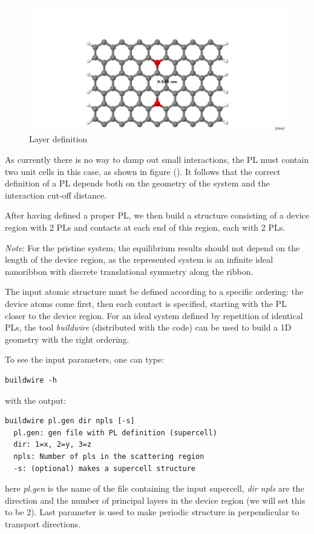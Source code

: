 \documentclass[a4paper,11pt,english]{sphinxmanual}
\begin{document}
{{\begin{figure}[htbp]
\includegraphics[width=0.800\linewidth]{4cell_7.png}
\caption{Layer definition}\label{transport:fig-4cell-7}\end{figure}

As currently there is no way to damp out small interactions, the PL
must contain two unit cells in this case, as shown in figure
{\hyperref[transport:fig-4cell-7]{\emph{}}} (). It follows that the correct definition of a PL
depends both on the geometry of the system and the interaction cut-off
distance.

After having defined a proper PL, we then build a structure consisting
of a device region with 2 PLs and contacts at each end of this region,
each with 2 PLs.

\emph{Note}: For the pristine system, the equilibrium results should not
depend on the length of the device region, as the represented system
is an infinite ideal nanoribbon with discrete translational symmetry
along the ribbon.

The input atomic structure must be defined according to a specific
ordering: the device atoms come first, then each contact is specified,
starting with the PL closer to the device region. For an ideal system
defined by repetition of identical PLs, the tool \emph{buildwire}
(distributed with the code) can be used to build a 1D geometry with
the right ordering.

To see the input parameters, one can type:
\begin{Verbatim}[commandchars=\\\{\}]
  buildwire -h
\end{Verbatim}
%
with the output:
%
\begin{Verbatim}[commandchars=\\\{\}]
  buildwire pl.gen dir npls [-s]
  pl.gen: gen file with PL definition (supercell)
  dir: 1=x, 2=y, 3=z
  npls: Number of pls in the scattering region
  -s: (optional) makes a supercell structure
\end{Verbatim}
%
here \emph{pl.gen} is the name of the file containing the input supercell,  \emph{dir npls} are the direction and the number of principal layers in the
device region (we will set this to be 2). Last parameter is used to make periodic structure in perpendicular to transport directions. 
  
}}
\end{document}
